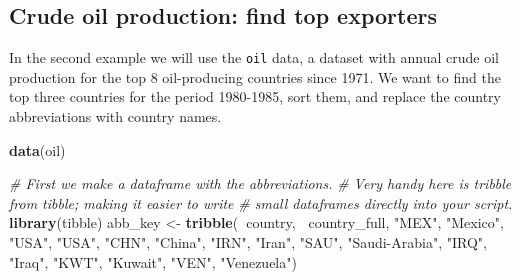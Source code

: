 \documentclass[]{book}
\newenvironment{Shaded}{\begin{snugshade}}{\end{snugshade}}
\newcommand{\CommentTok}[1]{\textcolor[rgb]{0.56,0.35,0.01}{\textit{#1}}}
\newcommand{\KeywordTok}[1]{\textcolor[rgb]{0.13,0.29,0.53}{\textbf{#1}}}
\newcommand{\NormalTok}[1]{#1}
\newcommand{\OperatorTok}[1]{\textcolor[rgb]{0.81,0.36,0.00}{\textbf{#1}}}
\newcommand{\StringTok}[1]{\textcolor[rgb]{0.31,0.60,0.02}{#1}}
\begin{document}
\hypertarget{crude-oil-production-find-top-exporters}{%
\subsection{Crude oil production: find top exporters}\label{crude-oil-production-find-top-exporters}}

In the second example we will use the \texttt{oil} data, a dataset with annual crude oil production for the top 8 oil-producing countries since 1971. We want to find the top three countries for the period 1980-1985, sort them, and replace the country abbreviations with country names.

\begin{Shaded}
\begin{Highlighting}[]
\KeywordTok{data}\NormalTok{(oil)}

\CommentTok{# First we make a dataframe with the abbreviations.}
\CommentTok{# Very handy here is tribble from tibble; making it easier to write}
\CommentTok{# small dataframes directly into your script.}
\KeywordTok{library}\NormalTok{(tibble)}
\NormalTok{abb_key <-}\StringTok{ }\KeywordTok{tribble}\NormalTok{(}\OperatorTok{~}\NormalTok{country, }\OperatorTok{~}\NormalTok{country_full,}
                      \StringTok{"MEX"}\NormalTok{,    }\StringTok{"Mexico"}\NormalTok{,}
                      \StringTok{"USA"}\NormalTok{,    }\StringTok{"USA"}\NormalTok{,}
                      \StringTok{"CHN"}\NormalTok{,    }\StringTok{"China"}\NormalTok{,}
                      \StringTok{"IRN"}\NormalTok{,    }\StringTok{"Iran"}\NormalTok{,}
                      \StringTok{"SAU"}\NormalTok{,    }\StringTok{"Saudi-Arabia"}\NormalTok{,}
                      \StringTok{"IRQ"}\NormalTok{,    }\StringTok{"Iraq"}\NormalTok{,}
                      \StringTok{"KWT"}\NormalTok{,    }\StringTok{"Kuwait"}\NormalTok{,}
                      \StringTok{"VEN"}\NormalTok{,    }\StringTok{"Venezuela"}\NormalTok{)}


\end{Highlighting}
\end{Shaded}
\end{document}

